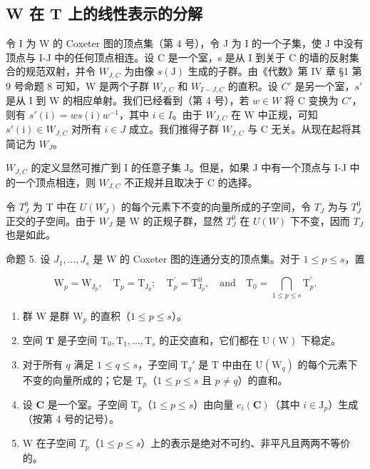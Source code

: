 \subsection{W 在 T 上的线性表示的分解}

令 I 为 W 的 Coxeter 图的顶点集（第 4 号），令 J 为 I 的一个子集，使 J 中没有顶点与 I-J 中的任何顶点相连。设 C 是一个室，s 是从 I 到关于 C 的墙的反射集合的规范双射，并令 \(W_{J,C}\) 为由像 \(s(\mathrm{J})\) 生成的子群。由《代数》第 IV 章 §1 第 9 号命题 8 可知，W 是两个子群 \(W_{J,C}\) 和 \(W_{I-J,C}\) 的直积。设 \(C'\) 是另一个室，\(s'\) 是从 I 到 W 的相应单射。我们已经看到（第 4 号），若 \(w \in W\) 将 C 变换为 \(C'\)，则有 \(s'(\mathrm{i}) = ws(\mathrm{i})w^{-1}\)，其中 \(i \in I\)。由于 \(W_{J,C}\) 在 W 中正规，可知 \(s'(\mathrm{i}) \in W_{J,C}\) 对所有 \(i \in J\) 成立。我们推得子群 \(W_{J,C}\) 与 C 无关。从现在起将其简记为 \(W_{J}\)。

\(W_{J,C}\) 的定义显然可推广到 I 的任意子集 J。但是，如果 J 中有一个顶点与 I-J 中的一个顶点相连，则 \(W_{J,C}\) 不正规并且取决于 C 的选择。

令 \(T_{J}^{0}\) 为 T 中在 \(U(W_{J})\) 的每个元素下不变的向量所成的子空间，令 \(T_{J}\) 为与 \(T_{J}^{0}\) 正交的子空间。由于 \(W_{J}\) 是 W 的正规子群，显然 \(T_{J}^{0}\) 在 \(U(W)\) 下不变，因而 \(T_{J}\) 也是如此。

命题 5. 设 \(J_{1},\ldots,J_{s}\) 是 W 的 Coxeter 图的连通分支的顶点集。对于 \(1\leqslant p\leqslant s\)，置

\[
\mathrm{W} _ {p} = \mathrm{W} _ {\mathrm{J} _ {p}}, \quad \mathrm{T} _ {p} = \mathrm{T} _ {\mathrm{J} _ {p}}; \quad \mathrm{T} _ {p} ^ {\prime} = \mathrm{T} _ {\mathrm{J} _ {p}} ^ {0}, \quad \text {and} \quad \mathrm{T} _ {0} = \bigcap_ {1 \leqslant p \leqslant s} \mathrm{T} _ {p} ^ {\prime}.
\]

\begin{enumerate}
\def\labelenumi{(\roman{enumi})}
\item
群 W 是群 \(\mathrm{W}_p\) 的直积（\(1 \leqslant p \leqslant s\)）。
\item
空间 \(\mathbf{T}\) 是子空间 \(\mathrm{T}_0, \mathrm{T}_1, \ldots, \mathrm{T}_s\) 的正交直和，它们都在 \(\mathrm{U}(\mathrm{W})\) 下稳定。
\item
对于所有 \(q\) 满足 \(1 \leqslant q \leqslant s\)，子空间 \(\mathrm{T}_q'\) 是 \(\mathrm{T}\) 中由在 \(\mathrm{U}(\mathrm{W}_q)\) 的每个元素下不变的向量所成的；它是 \(\mathrm{T}_p\)（\(1 \leqslant p \leqslant s\) 且 \(p \neq q\)）的直和。
\item
设 \(\mathbf{C}\) 是一个室。子空间 \(\mathrm{T}_p\)（\(1 \leqslant p \leqslant s\)）由向量 \(e_i(\mathbf{C})\)（其中 \(i \in \mathrm{J}_p\)）生成（按第 4 号的记号）。
\item
W 在子空间 \(T_{p}\)（\(1 \leqslant p \leqslant s\)）上的表示是绝对不可约、非平凡且两两不等价的。
\end{enumerate}

